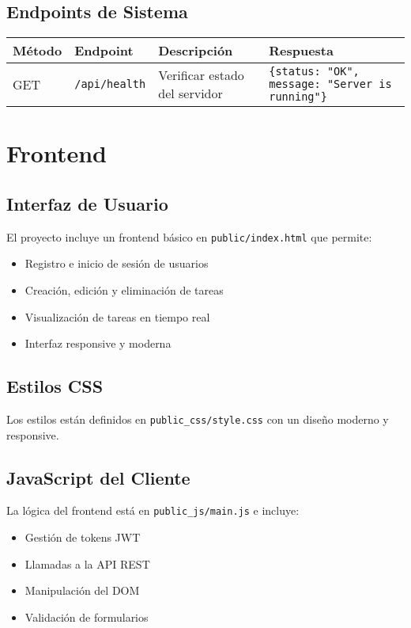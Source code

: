\documentclass[12pt,a4paper]{article}
\begin{document}
\subsection{Endpoints de Sistema}

\begin{longtable}{|l|l|l|p{6cm}|}
\hline
\textbf{Método} & \textbf{Endpoint} & \textbf{Descripción} & \textbf{Respuesta} \\
\hline
GET & \texttt{/api/health} & Verificar estado del servidor & \texttt{\{status: "OK", message: "Server is running"\}} \\
\hline
\end{longtable}

\section{Frontend}

\subsection{Interfaz de Usuario}

El proyecto incluye un frontend básico en \texttt{public/index.html} que permite:

\begin{itemize}
    \item Registro e inicio de sesión de usuarios
    \item Creación, edición y eliminación de tareas
    \item Visualización de tareas en tiempo real
    \item Interfaz responsive y moderna
\end{itemize}

\subsection{Estilos CSS}

Los estilos están definidos en \texttt{public\_css/style.css} con un diseño moderno y responsive.

\subsection{JavaScript del Cliente}

La lógica del frontend está en \texttt{public\_js/main.js} e incluye:

\begin{itemize}
    \item Gestión de tokens JWT
    \item Llamadas a la API REST
    \item Manipulación del DOM
    \item Validación de formularios
\end{itemize}
\end{document}
